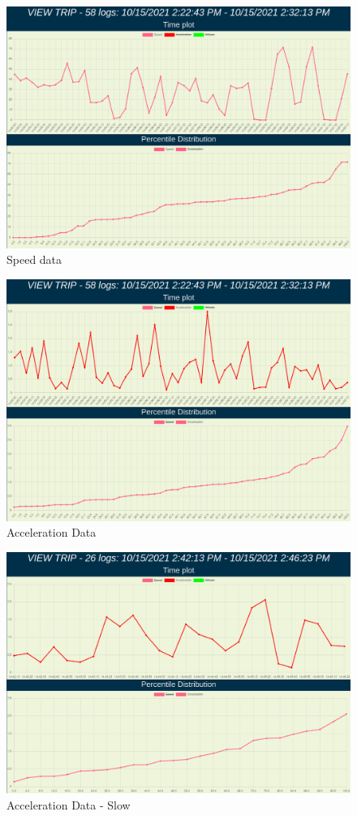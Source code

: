 \begin{figure}[H]
\centering
\includegraphics[width=5in]{eval_speed.png}
\caption{Speed data}
\label{fig:eval_speed}
\end{figure}

\begin{figure}[H]
\centering
\includegraphics[width=5in]{eval_accel.png}
\caption{Acceleration Data}
\label{fig:eval_accel}
\end{figure}

\begin{figure}[H]
\centering
\includegraphics[width=5in]{eval_accel_slow.png}
\caption{Acceleration Data - Slow}
\label{fig:eval_accel_slow}
\end{figure}


